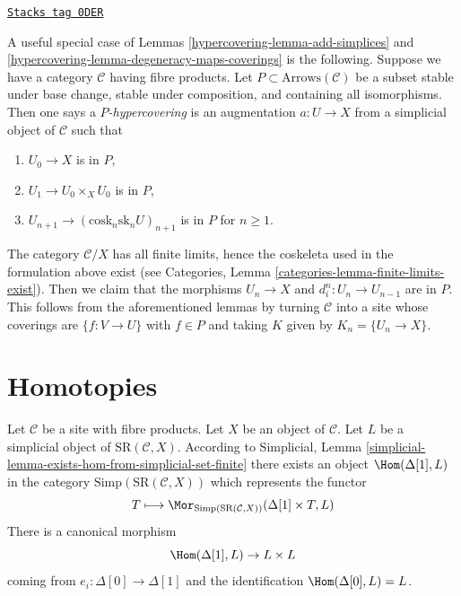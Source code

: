 \begin{remark}[P covering]
\label{hypercovering-remark-P-covering}
\href{https://stacks.math.columbia.edu/tag/0DER}{\texttt{Stacks tag 0DER}}

A useful special case of Lemmas \ref{hypercovering-lemma-add-simplices} and
\ref{hypercovering-lemma-degeneracy-maps-coverings} is the following.
Suppose we have a category $\mathcal{C}$ having fibre products.
Let $P \subset \text{Arrows}(\mathcal{C})$ be a subset
stable under base change, stable under composition,
and containing all isomorphisms. Then one says a
{\it $P$-hypercovering} is an augmentation $a : U \to X$
from a simplicial object of $\mathcal{C}$ such that
\begin{enumerate}
\item $U_0 \to X$ is in $P$,
\item $U_1 \to U_0 \times_X U_0$ is in $P$,
\item $U_{n + 1} \to (\text{cosk}_n\text{sk}_n U)_{n + 1}$
is in $P$ for $n \geq 1$.
\end{enumerate}
The category $\mathcal{C}/X$ has all finite limits, hence the
coskeleta used in the formulation above exist
(see Categories, Lemma \ref{categories-lemma-finite-limits-exist}).
Then we claim that the morphisms $U_n \to X$ and $d^n_i : U_n \to U_{n - 1}$
are in $P$. This follows from the aforementioned
lemmas by turning $\mathcal{C}$ into a site whose coverings
are $\{f : V \to U\}$ with $f \in P$ and taking $K$ given by
$K_n = \{U_n \to X\}$.
\end{remark}

\section{Homotopies}
\label{hypercovering-section-homotopies}
Let $\mathcal{C}$ be a site with fibre products.
Let $X$ be an object of $\mathcal{C}$.
Let $L$ be a simplicial object of $\text{SR}(\mathcal{C}, X)$.
According to
Simplicial, Lemma \ref{simplicial-lemma-exists-hom-from-simplicial-set-finite}
there exists an object $\Hom(\Delta[1], L)$
in the category $\text{Simp}(\text{SR}(\mathcal{C}, X))$ which represents the
functor
$$
T
\longmapsto
\Mor_{\text{Simp}(\text{SR}(\mathcal{C}, X))}(\Delta[1] \times T, L)
$$
There is a canonical morphism
$$
\Hom(\Delta[1], L) \to L \times L
$$
coming from $e_i : \Delta[0] \to \Delta[1]$ and the identification
$\Hom(\Delta[0], L) = L$.

